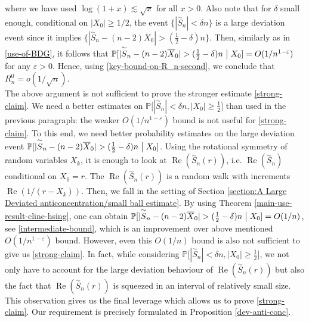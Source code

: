 \documentclass[9pt,a4paper,reqno]{amsart}
\renewcommand{\Re}{\operatorname{Re}}
\newcommand{\tildea}[1]{\overset{\sim}{#1}}
\theoremstyle{mine}
\theoremstyle{definition}
\theoremstyle{remark}
\renewcommand\epsilon{\varepsilon}
\newcommand{\mb}{\mathbb}
\begin{document}
    where we have used $\log(1+ x) \lesssim \sqrt{x}$ for all $x>0$.
    Also note that for $\delta$ small enough, conditional on $|X_0| \geq 1/2 $, the event $ \{|\tildea{S}_n| < \delta n \}$ is a large deviation event since it implies $\{|\tildea{S}_n - (n-2)\overline{X}_0| > (\frac{1}{2} - \delta) n \}$. Then, similarly as in \eqref{use-of-BDG}, it follows that $\mb{P}[ |\tildea{S}_n - (n-2)\overline{X}_0| > (\frac{1}{2} - \delta) n \hspace{1mm} \bigl|\hspace{1mm}X_0] = O(1/n^{1-\epsilon})$ for any $\epsilon >0$. Hence, using \eqref{key-bound-on-R_n-second}, we conclude that $R_n^0 = o(1/\sqrt{n})$. \\

    The above argument is not sufficient to prove the stronger estimate \eqref{strong-claim}. We need a better estimates on $\mb{P}\bigl[ |\tildea{S}_n| < \delta n, |X_0|  \geq \frac{1}{2}\bigr]$ than used in the previous paragraph: the weaker $O(1/n^{1-\epsilon})$ bound is not useful for \eqref{strong-claim}. To this end, we need better probability estimates on the large deviation event $\mb{P}[ |\tildea{S}_n - (n-2)\overline{X}_0| > (\frac{1}{2} - \delta) n \hspace{1mm} \bigl|\hspace{1mm}X_0]$. Using the rotational symmetry of random variables $X_k$, it is enough to look at $\Re(\tildea{S}_n(r))$, i.e. $\Re(\tildea{S}_n)$ conditional on $X_0 = r$. The $\Re(\tildea{S}_n(r))$ is a random walk with increments $\Re(1/(r-X_k))$. Then, we fall in the setting of Section \ref{section:A Large Deviated anticoncentration/small ball estimate}. By using Theorem \ref{main-use-result-cline-hsing}, one can obtain $\mb{P}[ |\tildea{S}_n - (n-2)\overline{X}_0| > (\frac{1}{2} - \delta) n \hspace{1mm} \bigl|\hspace{1mm}X_0] = O(1/n)$, see \eqref{intermediate-bound}, which is an improvement over above mentioned $O(1/n^{1-\epsilon})$ bound. However, even this $O(1/n)$ bound is also not sufficient to give us \eqref{strong-claim}. In fact, while considering $\mb{P}\bigl[ |\tildea{S}_n| < \delta n, |X_0|  \geq \frac{1}{2}\bigr]$, we not only have to account for the large deviation behaviour of $\Re(\tildea{S}_n(r))$ but also the fact that $\Re(\tildea{S}_n(r))$ is squeezed in an interval of relatively small size. This observation gives us the final leverage which allows us to prove \eqref{strong-claim}. Our requirement is precisely formulated in Proposition \ref{dev-anti-conc}. \\
    
\end{document}
